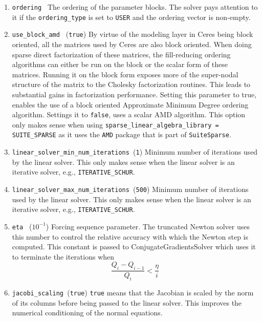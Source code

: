 \begin{enumerate}
\item{\texttt{ordering }} The ordering of the parameter blocks. The solver pays attention
    to it if the \texttt{ordering\_type} is set to \texttt{USER} and the ordering vector is
    non-empty.

\item{\texttt{use\_block\_amd } (\texttt{true})} By virtue of the modeling layer in Ceres being block oriented,
all the matrices used by Ceres are also block oriented.
When doing sparse direct factorization of these matrices, the
fill-reducing ordering algorithms can either be run on the
block or the scalar form of these matrices. Running it on the
block form exposes more of the super-nodal structure of the
matrix to the Cholesky factorization routines. This leads to
substantial gains in factorization performance. Setting this parameter to true, enables the use of a block oriented Approximate Minimum Degree ordering algorithm. Settings it to \texttt{false}, uses a scalar AMD algorithm. This option only makes sense when using \texttt{sparse\_linear\_algebra\_library = SUITE\_SPARSE} as it uses the \texttt{AMD} package that is part of \texttt{SuiteSparse}.

\item{\texttt{linear\_solver\_min\_num\_iterations }}(\texttt{1}) Minimum number of iterations used by the linear solver. This only makes sense when the linear solver is an iterative solver, e.g., \texttt{ITERATIVE\_SCHUR}.

\item{\texttt{linear\_solver\_max\_num\_iterations }}(\texttt{500}) Minimum number of iterations used by the linear solver. This only makes sense when the linear solver is an iterative solver, e.g., \texttt{ITERATIVE\_SCHUR}.

\item{\texttt{eta }} ($10^{-1}$)
 Forcing sequence parameter. The truncated Newton solver uses
    this number to control the relative accuracy with which the
     Newton step is computed. This constant is passed to ConjugateGradientsSolver which uses
     it to terminate the iterations when
\begin{equation}    
      \frac{Q_i - Q_{i-1}}{Q_i} < \frac{\eta}{i}
\end{equation}

\item{\texttt{jacobi\_scaling }}(\texttt{true}) \texttt{true} means that the Jacobian is scaled by the norm of its columns before being passed to the linear solver. This improves the numerical conditioning of the normal equations.


\end{enumerate}

